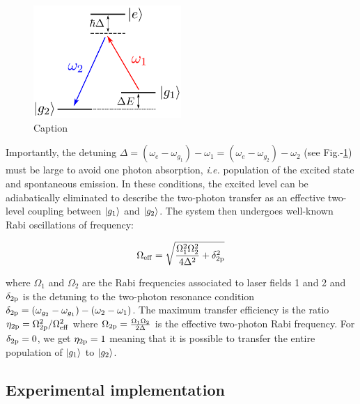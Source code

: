 
\begin{figure}
    \centering
    \includegraphics[width=0.5\textwidth]{Fig/Chapter3/raman_level.png}
    \caption{Caption}
    \label{fig:raman_level}
\end{figure}


Importantly, the detuning $\Delta=(\omega_{e}-\omega_{g_1})-\omega_1=(\omega_{e}-\omega_{g_2})-\omega_2$ (see Fig.-\ref{fig:raman_level}) must be large to avoid one photon absorption, {\it i.e.} population of the excited state and spontaneous emission. In these conditions, the excited level can be adiabatically eliminated to describe the two-photon transfer as an effective two-level coupling between $\ket{g_1}$ and $\ket{g_2}$. The system then undergoes well-known Rabi oscillations of frequency:

\begin{equation}
    \Omega_{\rm{eff}}= \sqrt{\frac{\Omega_1^2 \Omega_2^2}{4 \Delta^2} + \delta_{\rm{2p}}^2}
\end{equation}

\noindent where $\Omega_1$ and $\Omega_2$ are the Rabi frequencies associated to laser fields 1 and 2 and $\delta_{\rm{2p}}$ is the detuning to the two-photon resonance condition $\delta_{\rm{2p}}=(\omega_{g_2} - \omega_{g_1}) - (\omega_2-\omega_1)$. The maximum transfer efficiency is the ratio $\eta_{\rm{2p}}=\Omega_{\rm{2p}}^2 /\Omega^2_{\rm{eff}}$ where $\Omega_{\rm{2p}}=\frac{\Omega_1 \Omega_2}{2 \Delta}$ is the effective two-photon Rabi frequency. For $\delta_{\rm{2p}}=0$, we get $\eta_{\rm{2p}}=1$ meaning that it is possible to transfer the entire population of $\ket{g_1}$ to $\ket{g_2}$.

\subsection{Experimental implementation}

